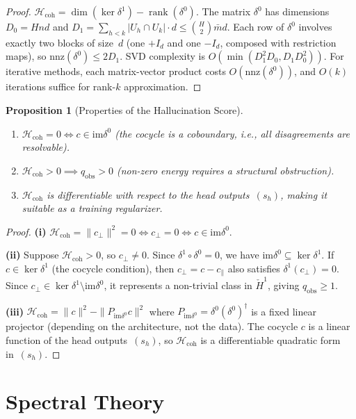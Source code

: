 \documentclass[11pt,a4paper]{article}
\theoremstyle{plain}
\newtheorem{proposition}[theorem]{Proposition}
\theoremstyle{definition}
\theoremstyle{remark}
\newcommand{\im}{\mathrm{im}}
\newcommand{\Hcoh}{\mathcal{H}_{\mathrm{coh}}}
\newcommand{\CechH}{\check{H}}
\DeclareMathOperator{\rank}{rank}
\begin{document}
\begin{proof}
$\Hcoh = \dim(\ker\delta^1) - \rank(\delta^0)$. The matrix $\delta^0$ has dimensions $D_0 = Hnd$ and $D_1 = \sum_{h<k} |U_h \cap U_k| \cdot d \leq \binom{H}{2}\bar{m}d$. Each row of $\delta^0$ involves exactly two blocks of size~$d$ (one $+I_d$ and one $-I_d$, composed with restriction maps), so $\mathrm{nnz}(\delta^0) \leq 2D_1$. SVD complexity is $O(\min(D_1^2 D_0, D_1 D_0^2))$. For iterative methods, each matrix-vector product costs $O(\mathrm{nnz}(\delta^0))$, and $O(k)$ iterations suffice for rank-$k$ approximation.
\end{proof}

\begin{proposition}[Properties of the Hallucination Score]\label{prop:cont-equiv}
\begin{enumerate}[label=(\roman*),nosep]
\item $\Hcoh = 0 \iff c \in \im\delta^0$ (the cocycle is a coboundary, i.e., all disagreements are resolvable).
\item $\Hcoh > 0 \implies q_{\mathrm{obs}} > 0$ (non-zero energy requires a structural obstruction).
\item $\Hcoh$ is differentiable with respect to the head outputs~$(s_h)$, making it suitable as a training regularizer.
\end{enumerate}
\end{proposition}

\begin{proof}
\textbf{(i)} $\Hcoh = \|c_\perp\|^2 = 0 \iff c_\perp = 0 \iff c \in \im\delta^0$.

\textbf{(ii)} Suppose $\Hcoh > 0$, so $c_\perp \neq 0$. Since $\delta^1 \circ \delta^0 = 0$, we have $\im\delta^0 \subseteq \ker\delta^1$. If $c \in \ker\delta^1$ (the cocycle condition), then $c_\perp = c - c_\parallel$ also satisfies $\delta^1(c_\perp) = 0$. Since $c_\perp \in \ker\delta^1 \setminus \im\delta^0$, it represents a non-trivial class in $\CechH^1$, giving $q_{\mathrm{obs}} \geq 1$.

\textbf{(iii)} $\Hcoh = \|c\|^2 - \|P_{\im\delta^0} c\|^2$ where $P_{\im\delta^0} = \delta^0 (\delta^0)^\dagger$ is a fixed linear projector (depending on the architecture, not the data). The cocycle $c$ is a linear function of the head outputs~$(s_h)$, so $\Hcoh$ is a differentiable quadratic form in~$(s_h)$.
\end{proof}

\section{Spectral Theory}\label{sec:spectral}
\end{document}
